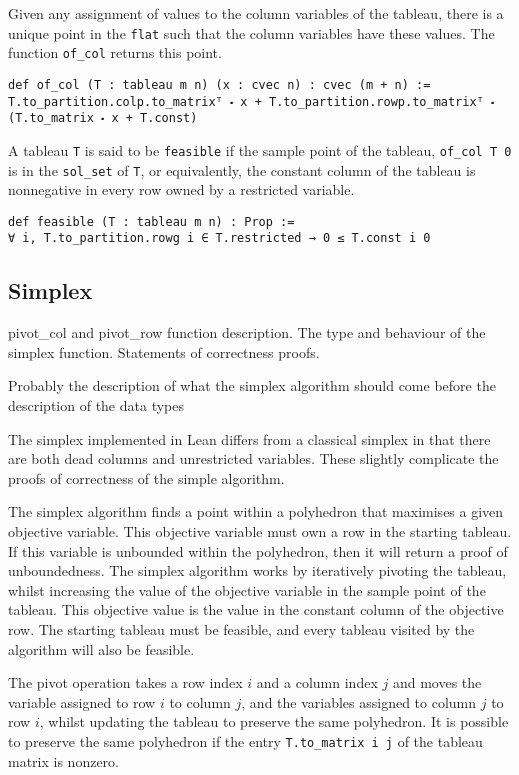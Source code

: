 \documentclass[11pt]{article} %
\begin{document}
Given any assignment of values to the column variables of the tableau, there is a unique point in the \lstinline|flat| such that the column variables have these values. The function \lstinline|of_col| returns this point.
\begin{lstlisting}
def of_col (T : tableau m n) (x : cvec n) : cvec (m + n) :=
T.to_partition.colp.to_matrixᵀ ⬝ x + T.to_partition.rowp.to_matrixᵀ ⬝ (T.to_matrix ⬝ x + T.const)
\end{lstlisting}

A tableau \lstinline|T| is said to be \lstinline|feasible| if the sample point of the tableau, \lstinline|of_col T 0| is in the \lstinline|sol_set| of \lstinline|T|, or equivalently, the constant column of the tableau is nonnegative in every row owned by a restricted variable.

\begin{lstlisting}
def feasible (T : tableau m n) : Prop :=
∀ i, T.to_partition.rowg i ∈ T.restricted → 0 ≤ T.const i 0
\end{lstlisting}

\subsection{Simplex}
\color{red}pivot\_col and pivot\_row function description. The type and behaviour of the simplex function. Statements of correctness proofs.\color{black}

\color{red}Probably the description of what the simplex algorithm should come before the description of the data types\color{black}

The simplex implemented in Lean differs from a classical simplex in that there are both dead columns and unrestricted variables. These slightly complicate the proofs of correctness of the simple algorithm.

The simplex algorithm finds a point within a polyhedron that maximises a given objective variable. This objective variable must own a row in the starting tableau. If this variable is unbounded within the polyhedron, then it will return a proof of unboundedness. The simplex algorithm works by iteratively pivoting the tableau, whilst increasing the value of the
objective variable in the sample point of the tableau. This objective value is the value in the constant column of the objective row. The starting tableau must be feasible, and every tableau visited by the algorithm will also be feasible.

The pivot operation takes a row index $i$ and a column index $j$ and moves the variable assigned to row $i$ to column $j$, and the variables assigned to column $j$ to row $i$, whilst updating the tableau to preserve the same polyhedron. It is possible to preserve the same polyhedron if the entry \lstinline|T.to_matrix i j| of the tableau matrix is nonzero.
\end{document}
